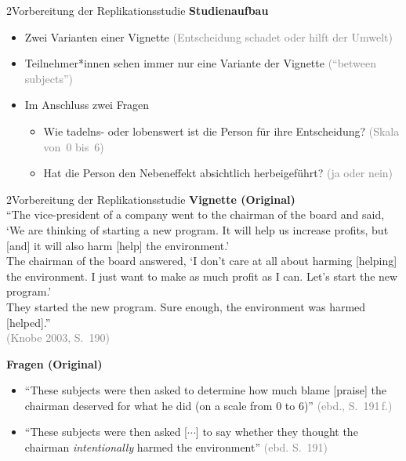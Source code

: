 \documentclass[xcolor=table,9pt,aspectratio=169]{beamer}
\begin{document}
\begin{frame}{\vspace*{10mm}2\hspace*{1em}Vorbereitung der Replikationsstudie}
\textbf{Studienaufbau}\\
\begin{itemize}
   \item Zwei Varianten einer Vignette \textcolor{gray}{(Entscheidung schadet oder hilft der Umwelt)}
   \item Teilnehmer*innen sehen immer nur eine Variante der Vignette \textcolor{gray}{(\enquote{between subjects})}
   \item Im Anschluss zwei Fragen
   \begin{itemize}
      \item Wie tadelns- oder lobenswert ist die Person für ihre Entscheidung? \textcolor{gray}{(Skala von~0 bis~6)}
      \item Hat die Person den Nebeneffekt absichtlich herbeigeführt? \textcolor{gray}{(ja oder nein)}
   \end{itemize}
\end{itemize}
\end{frame}


\begin{frame}{\vspace*{10mm}2\hspace*{1em}Vorbereitung der Replikationsstudie}
\textbf{Vignette (Original)}\\
\smallskip
\enquote{The vice-president of a company went to the chairman of the board and said, \enquote{We are thinking of starting a new program. It will help us increase profits, but \textcolor{blue2}{[and]} it will also harm \textcolor{blue2}{[help]} the environment.}\\\vspace{0.25em}
The chairman of the board answered, \enquote{I don't care at all about harming \textcolor{blue2}{[helping]} the environment. I just want to make as much profit as I can. Let's start the new program.}\\\vspace{0.25em}
They started the new program. Sure enough, the environment was harmed \textcolor{blue2}{[helped]}.}\\
\textcolor{gray}{(Knobe 2003, S.~190)}

\bigskip
\textbf{Fragen (Original)}\\
\begin{itemize}
   \item \enquote{These subjects were then asked to determine how much blame \textcolor{blue2}{[praise]} the chairman deserved for what he did (on a scale from 0 to 6)} \textcolor{gray}{(ebd., S.~191\,f.)}
   \item \enquote{These subjects were then asked [$\cdots$] to say whether they thought the chairman \textit{intentionally} harmed the environment} \textcolor{gray}{(ebd. S.~191)}
\end{itemize}
\end{frame}
\end{document}
